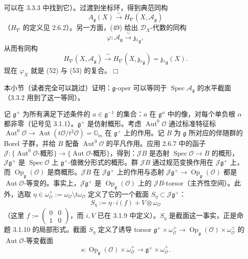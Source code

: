 可以在 3.3.3 中找到它）。过渡到坐标环，得到典范同构
\begin{equation}\tag{52}
  A_{\mathfrak{g}}(X)\xrightarrow{\ \sim\ }H_{\nabla}(X,\mathcal{A}_{\mathfrak{g}})
\end{equation}
（$H_{\nabla}$ 的定义见 2.6.2）。另一方面，(49) 给出 $\mathcal{D}_{X}$-代数的同构
\[
  \varphi : \mathcal{A}_{\mathfrak{g}}\xrightarrow{\ \sim\ }\mathfrak{z}_{{}^{L}\mathfrak{g}},
\]
从而有同构
\begin{equation}\tag{53}
  H_{\nabla}(X,\mathcal{A}_{\mathfrak{g}})\xrightarrow{\ \sim\ }H_{\nabla}(X,\mathfrak{z}_{{}^{L}\mathfrak{g}})
  =\mathfrak{z}_{{}^{L}\mathfrak{g}}(X).
\end{equation}
现在 $\varphi_{X}$ 就是 (52) 与 (53) 的复合。\hfill$\Box$

 本小节（读者完全可以跳过）证明：$\mathfrak{g}$-oper 可以等同于 $\operatorname{Spec}\mathcal{A}_{\mathfrak{g}}$ 的水平截面（3.3.2 用到了这一等同）。

记 $\mathfrak{g}^{+}$ 为所有满足下述条件的 $a\in\mathfrak{g}^{-1}$ 的集合：$a$ 在 $\mathfrak{g}^{\alpha}$ 中的像，对每个单负根 $\alpha$ 都非零（记号见 3.1.1）。$\mathfrak{g}^{+}$ 是仿射概形。考虑 $\operatorname{Aut}^{0}\mathcal{O}$ 通过标准特征标 $\operatorname{Aut}^{0}\mathcal{O}\to\operatorname{Aut}(t\mathcal{O}/t^{2}\mathcal{O})=\mathbb{G}_{m}$ 在 $\mathfrak{g}^{+}$ 上的作用。记 $B$ 为 $\mathfrak{g}$ 所对应的伴随群的 Borel 子群，并给 $B$ 配备 $\operatorname{Aut}^{0}\mathcal{O}$ 的平凡作用。应用 2.6.7 中的函子 $\mathcal{J}:\{\operatorname{Aut}^{0}\mathcal{O}\text{-概形}\}\to\{\operatorname{Aut}\mathcal{O}\text{-概形}\}$，得到：$\mathcal{J}B$ 是态射 $\operatorname{Spec}\mathcal{O}\to B$ 的概形，$\mathcal{J}\mathfrak{g}^{+}$ 是 $\operatorname{Spec}\mathcal{O}$ 上 $\mathfrak{g}^{+}$-值微分形式的概形。群 $\mathcal{J}B$ 通过规范变换作用在 $\mathcal{J}\mathfrak{g}^{+}$ 上，而 $\operatorname{Op}_{\mathfrak{g}}(\mathcal{O})$ 是商概形。$\mathcal{J}B$ 在 $\mathcal{J}\mathfrak{g}^{+}$ 上的作用与态射 $\mathcal{J}\mathfrak{g}^{+}\to\operatorname{Op}_{\mathfrak{g}}(\mathcal{O})$ 都是 $\operatorname{Aut}\mathcal{O}$-等变的。事实上，$\mathcal{J}\mathfrak{g}^{+}$ 是 $\operatorname{Op}_{\mathfrak{g}}(\mathcal{O})$ 上的 $\mathcal{J}B$-torsor（主齐性空间）。此外，选取 $\eta\in\omega_{\mathcal{O}}^{+}:=\omega_{\mathcal{O}}\setminus t\omega_{\mathcal{O}}$ 定义了它的一个截面 $S_{\eta}\subset\mathcal{J}\mathfrak{g}^{+}$：
\[
  S_{\eta}:=\eta\cdot i(f)+V\otimes\omega_{\mathcal{O}}
\]
（这里 $f:=\begin{pmatrix}0&0\\1&0\end{pmatrix}$，而 $i,V$ 已在 3.1.9 中定义）。$S_{\eta}$ 是截面这一事实，正是命题 3.1.10 的局部形式。截面 $S_{\eta}$ 定义了诱导 torsor $\mathfrak{g}^{+}\times\omega_{\mathcal{O}}^{+}\to\operatorname{Op}_{\mathfrak{g}}(\mathcal{O})\times\omega_{\mathcal{O}}^{+}$ 的 $\operatorname{Aut}\mathcal{O}$-等变截面
\[
  s : \operatorname{Op}_{\mathfrak{g}}(\mathcal{O})\times\omega_{\mathcal{O}}^{+}\longrightarrow\mathfrak{g}^{+}\times\omega_{\mathcal{O}}^{+}.
\]


